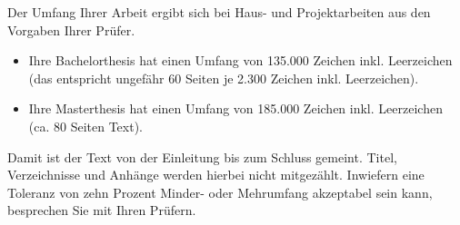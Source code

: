 Der Umfang Ihrer Arbeit ergibt sich bei Haus- und Projektarbeiten aus den Vorgaben Ihrer Prüfer.
\begin{itemize}[label={--}]
\item Ihre Bachelorthesis hat einen Umfang von 135.000 Zeichen inkl. Leerzeichen (das entspricht ungefähr 60 Seiten je 2.300 Zeichen inkl. Leerzeichen).
\item Ihre Masterthesis hat einen Umfang von 185.000 Zeichen inkl. Leerzeichen (ca. 80 Seiten Text).
\end{itemize}

Damit ist der Text von der Einleitung bis zum Schluss gemeint. Titel, Verzeichnisse und Anhänge werden hierbei nicht mitgezählt. Inwiefern eine Toleranz von zehn Prozent Minder- oder Mehrumfang akzeptabel sein kann, besprechen Sie mit Ihren Prüfern.
